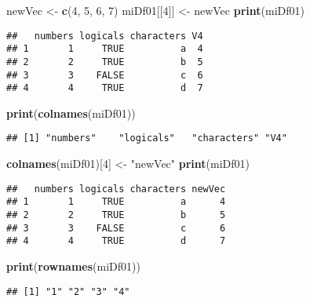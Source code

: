 \documentclass[]{book}
\newenvironment{Shaded}{\begin{snugshade}}{\end{snugshade}}
\newcommand{\KeywordTok}[1]{\textcolor[rgb]{0.13,0.29,0.53}{\textbf{#1}}}
\newcommand{\DecValTok}[1]{\textcolor[rgb]{0.00,0.00,0.81}{#1}}
\newcommand{\StringTok}[1]{\textcolor[rgb]{0.31,0.60,0.02}{#1}}
\newcommand{\NormalTok}[1]{#1}
\theoremstyle{definition}
\theoremstyle{definition}
\theoremstyle{definition}
\theoremstyle{remark}
\begin{document}
\begin{Shaded}
\begin{Highlighting}[]
\NormalTok{newVec <-}\StringTok{ }\KeywordTok{c}\NormalTok{(}\DecValTok{4}\NormalTok{, }\DecValTok{5}\NormalTok{, }\DecValTok{6}\NormalTok{, }\DecValTok{7}\NormalTok{)}
\NormalTok{miDf01[[}\DecValTok{4}\NormalTok{]] <-}\StringTok{ }\NormalTok{newVec}
\KeywordTok{print}\NormalTok{(miDf01)}
\end{Highlighting}
\end{Shaded}

\begin{verbatim}
##   numbers logicals characters V4
## 1       1     TRUE          a  4
## 2       2     TRUE          b  5
## 3       3    FALSE          c  6
## 4       4     TRUE          d  7
\end{verbatim}

\begin{Shaded}
\begin{Highlighting}[]
\KeywordTok{print}\NormalTok{(}\KeywordTok{colnames}\NormalTok{(miDf01))}
\end{Highlighting}
\end{Shaded}

\begin{verbatim}
## [1] "numbers"    "logicals"   "characters" "V4"
\end{verbatim}

\begin{Shaded}
\begin{Highlighting}[]
\KeywordTok{colnames}\NormalTok{(miDf01)[}\DecValTok{4}\NormalTok{] <-}\StringTok{ "newVec"}
\KeywordTok{print}\NormalTok{(miDf01)}
\end{Highlighting}
\end{Shaded}

\begin{verbatim}
##   numbers logicals characters newVec
## 1       1     TRUE          a      4
## 2       2     TRUE          b      5
## 3       3    FALSE          c      6
## 4       4     TRUE          d      7
\end{verbatim}

\begin{Shaded}
\begin{Highlighting}[]
\KeywordTok{print}\NormalTok{(}\KeywordTok{rownames}\NormalTok{(miDf01))}
\end{Highlighting}
\end{Shaded}

\begin{verbatim}
## [1] "1" "2" "3" "4"
\end{verbatim}
\end{document}

